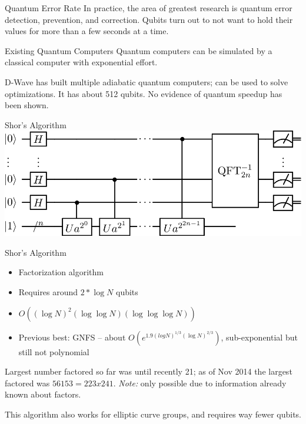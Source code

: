 \documentclass[12pt]{beamer}
\begin{document}
\begin{frame}{Quantum Error Rate}
	In practice, the area of greatest research is quantum error detection,
	prevention, and correction. Qubits turn out to not want to hold their values
	for more than a few seconds at a time.
\end{frame}

\begin{frame}{Existing Quantum Computers}
	Quantum computers can be simulated by a classical computer with exponential
	effort.

	D-Wave has built multiple adiabatic quantum computers; can be used to solve
	optimizations. It has about 512 qubits. No evidence of quantum speedup has
	been shown.
\end{frame}

\begin{frame}{Shor's Algorithm}
	\includegraphics[width=\framewidth]{pictures/shor}
\end{frame}

\begin{frame}{Shor's Algorithm}
	\begin{itemize}
		\item Factorization algorithm
		\item Requires around $2 * \log N$ qubits
		\item $O((\log N)^2(\log\log N)(\log\log\log N))$
		\item Previous best: GNFS -- about $O(e^{1.9 (log N)^{1/3}(\log
			N)^{2/3}})$, sub-exponential but still not polynomial
	\end{itemize}
	Largest number factored so far was until recently 21; as of Nov
	2014 the largest factored was $56153 = 223 x 241$. \textit{Note:}
	only possible due to information already known about factors.
	\begin{alertblock}{}
		This algorithm also works for elliptic curve groups, and requires way
		fewer qubits.
	\end{alertblock}
\end{frame}
\end{document}
